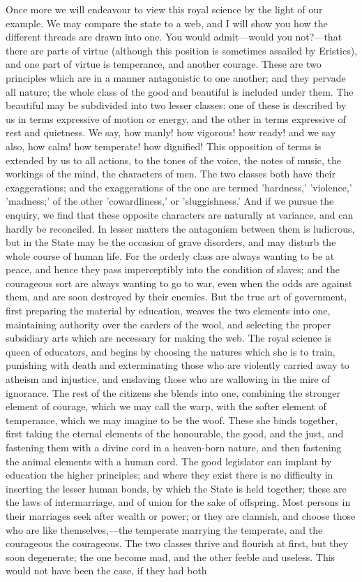 \documentclass[11pt,letter]{article}
\begin{document}
\par  Once more we will endeavour to view this royal science by the light of our example. We may compare the state to a web, and I will show you how the different threads are drawn into one. You would admit—would you not?—that there are parts of virtue (although this position is sometimes assailed by Eristics), and one part of virtue is temperance, and another courage. These are two principles which are in a manner antagonistic to one another; and they pervade all nature; the whole class of the good and beautiful is included under them. The beautiful may be subdivided into two lesser classes: one of these is described by us in terms expressive of motion or energy, and the other in terms expressive of rest and quietness. We say, how manly! how vigorous! how ready! and we say also, how calm! how temperate! how dignified! This opposition of terms is extended by us to all actions, to the tones of the voice, the notes of music, the workings of the mind, the characters of men. The two classes both have their exaggerations; and the exaggerations of the one are termed 'hardness,' 'violence,' 'madness;' of the other 'cowardliness,' or 'sluggishness.' And if we pursue the enquiry, we find that these opposite characters are naturally at variance, and can hardly be reconciled. In lesser matters the antagonism between them is ludicrous, but in the State may be the occasion of grave disorders, and may disturb the whole course of human life. For the orderly class are always wanting to be at peace, and hence they pass imperceptibly into the condition of slaves; and the courageous sort are always wanting to go to war, even when the odds are against them, and are soon destroyed by their enemies. But the true art of government, first preparing the material by education, weaves the two elements into one, maintaining authority over the carders of the wool, and selecting the proper subsidiary arts which are necessary for making the web. The royal science is queen of educators, and begins by choosing the natures which she is to train, punishing with death and exterminating those who are violently carried away to atheism and injustice, and enslaving those who are wallowing in the mire of ignorance. The rest of the citizens she blends into one, combining the stronger element of courage, which we may call the warp, with the softer element of temperance, which we may imagine to be the woof. These she binds together, first taking the eternal elements of the honourable, the good, and the just, and fastening them with a divine cord in a heaven-born nature, and then fastening the animal elements with a human cord. The good legislator can implant by education the higher principles; and where they exist there is no difficulty in inserting the lesser human bonds, by which the State is held together; these are the laws of intermarriage, and of union for the sake of offspring. Most persons in their marriages seek after wealth or power; or they are clannish, and choose those who are like themselves,—the temperate marrying the temperate, and the courageous the courageous. The two classes thrive and flourish at first, but they soon degenerate; the one become mad, and the other feeble and useless. This would not have been the case, if they had both 
\end{document}
